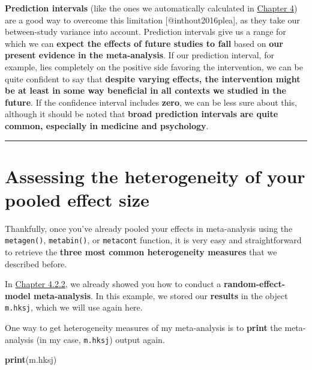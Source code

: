 \documentclass[]{book}
\newenvironment{Shaded}{\begin{snugshade}}{\end{snugshade}}
\newcommand{\KeywordTok}[1]{\textcolor[rgb]{0.13,0.29,0.53}{\textbf{#1}}}
\newcommand{\NormalTok}[1]{#1}
\theoremstyle{definition}
\theoremstyle{definition}
\theoremstyle{definition}
\theoremstyle{remark}
\begin{document}
\begin{rmdachtung}
\textbf{Prediction intervals} (like the ones we automatically calculated
in \protect\hyperlink{pool}{Chapter 4}) are a good way to overcome this
limitation {[}@inthout2016plea{]}, as they take our between-study
variance into account. Prediction intervals give us a range for which we
can \textbf{expect the effects of future studies to fall} based on
\textbf{our present evidence in the meta-analysis}. If our prediction
interval, for example, lies completely on the positive side favoring the
intervention, we can be quite confident to say that \textbf{despite
varying effects, the intervention might be at least in some way
beneficial in all contexts we studied in the future}. If the confidence
interval includes \textbf{zero}, we can be less sure about this,
although it should be noted that \textbf{broad prediction intervals are
quite common, especially in medicine and psychology}.
\end{rmdachtung}

\begin{center}\rule{0.5\linewidth}{\linethickness}\end{center}

\section{Assessing the heterogeneity of your pooled effect
size}\label{assessing-the-heterogeneity-of-your-pooled-effect-size}

Thankfully, once you've already pooled your effects in meta-analysis
using the \texttt{metagen()}, \texttt{metabin()}, or \texttt{metacont}
function, it is very easy and straightforward to retrieve the
\textbf{three most common heterogeneity measures} that we described
before.

In \protect\hyperlink{random.precalc}{Chapter 4.2.2}, we already showed
you how to conduct a \textbf{random-effect-model meta-analysis}. In this
example, we stored our \textbf{results} in the object \texttt{m.hksj},
which we will use again here.

One way to get heterogeneity measures of my meta-analysis is to
\textbf{print} the meta-analysis (in my case, \texttt{m.hksj}) output
again.

\begin{Shaded}
\begin{Highlighting}[]
\KeywordTok{print}\NormalTok{(m.hksj)}
\end{Highlighting}
\end{Shaded}
\end{document}
